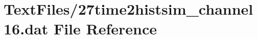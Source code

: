 \hypertarget{27time2histsim__channel16_8dat}{}\section{Text\+Files/27time2histsim\+\_\+channel16.dat File Reference}
\label{27time2histsim__channel16_8dat}
